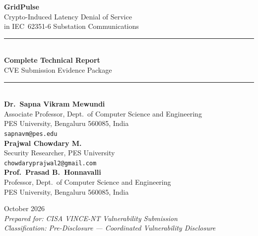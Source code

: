 \documentclass[11pt,a4paper]{article}
\begin{document}
\begin{titlepage}
\centering
\vspace*{2cm}

{\Huge\bfseries\color{blue!70!black} GridPulse}\\[0.5cm]
{\LARGE Crypto-Induced Latency Denial of Service\\in IEC~62351-6 Substation Communications}\\[1.5cm]

\rule{\textwidth}{1pt}\\[0.5cm]
{\Large\textbf{Complete Technical Report}}\\[0.3cm]
{\large CVE Submission Evidence Package}\\[0.5cm]
\rule{\textwidth}{1pt}\\[2cm]

{\large
\textbf{Dr.\ Sapna Vikram Mewundi}\\
Associate Professor, Dept.\ of Computer Science and Engineering\\
PES University, Bengaluru 560085, India\\
\texttt{sapnavm@pes.edu}\\[0.8cm]

\textbf{Prajwal Chowdary M.}\\
Security Researcher, PES University\\
\texttt{chowdaryprajwal2@gmail.com}\\[0.8cm]

\textbf{Prof.\ Prasad B.\ Honnavalli}\\
Professor, Dept.\ of Computer Science and Engineering\\
PES University, Bengaluru 560085, India\\
}

\vfill

{\large October 2026}\\[0.5cm]
{\small\textit{Prepared for: CISA VINCE-NT Vulnerability Submission}\\
\textit{Classification: Pre-Disclosure --- Coordinated Vulnerability Disclosure}}

\end{titlepage}
\end{document}
